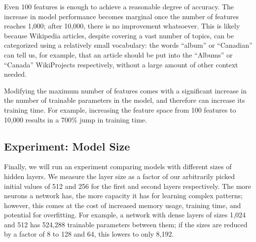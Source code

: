 \documentclass{article}
\begin{document}
Even 100 features is enough to achieve a reasonable degree of accuracy. The increase in model
performance becomes marginal once the number of features reaches 1,000; after 10,000, there is
no improvement whatsoever. This is likely because Wikipedia articles, despite covering a vast
number of topics, can be categorized using a relatively small vocabulary: the words ``album''
or ``Canadian'' can tell us, for example, that an article should be put into the ``Albums''
or ``Canada'' WikiProjects respectively, without a large amount of other context needed.

Modifying the maximum number of features comes with a significant increase in the number of
trainable parameters in the model, and therefore can increase its training time. For example,
increasing the feature space from 100 features to 10,000 results in a 700\% jump in training time.

\newpage

\subsection{Experiment: Model Size}

Finally, we will run an experiment comparing models with different sizes of hidden layers.
We measure the layer size as a factor of our arbitrarily picked initial values of 512 and 256
for the first and second layers respectively. The more neurons a network has, the more capacity
it has for learning complex patterns; however, this comes at the cost of increased memory
usage, training time, and potential for overfitting. For example, a network with dense layers
of sizes 1,024 and 512 has 524,288 trainable parameters between them; if the sizes are reduced
by a factor of 8 to 128 and 64, this lowers to only 8,192.
\end{document}
